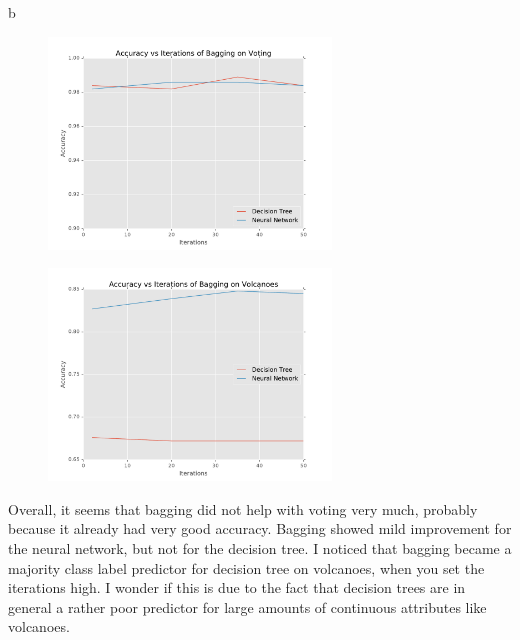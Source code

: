 \documentclass[fleqn]{homework}
\begin{document}
\begin{problem}{b}
    \begin{figure}[h!]
      \centering
      \caption{}
      \label{f:b-voting}
      \includegraphics[width=0.67\textwidth]{b-voting.pdf}
    \end{figure}
    \begin{figure}[h!]
      \centering
      \caption{}
      \label{f:b-volcanoes}
      \includegraphics[width=0.67\textwidth]{b-volcanoes.pdf}
    \end{figure}

    Overall, it seems that bagging did not help with voting very much, probably
    because it already had very good accuracy.  Bagging showed mild improvement
    for the neural network, but not for the decision tree.  I noticed that
    bagging became a majority class label predictor for decision tree on
    volcanoes, when you set the iterations high.  I wonder if this is due to the
    fact that decision trees are in general a rather poor predictor for large
    amounts of continuous attributes like volcanoes.
  \end{problem}
\end{document}
